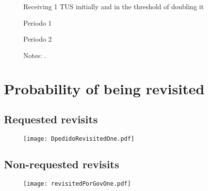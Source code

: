 \documentclass[12pt]{article}
\begin{document}
\begin{figure}[H]%
	\caption{Receiving 1 TUS initially and in the threshold of doubling it}%
	\centering
	\caption*{ {Periodo 1}}
	\qquad
	\caption*{Periodo 2}
	\label{fig:pp2013_seg_2TUS}%
	\caption*{ {\footnotesize Notes: .}}
\end{figure}

\section{Probability of being revisited}

\subsection{Requested revisits}
\begin{figure}[H]
	\centering
	\texttt{[image: DpedidoRevisitedOne.pdf]}
	\label{DpedidoRevisitedOne}
\end{figure}

\begin{landscape}
\begin{figure}[H]
	\centering
	
	\label{DpedidoRevisited1Tex}
\end{figure}
\end{landscape}

\begin{landscape}
	\begin{figure}[H]
		\centering
		
		\label{DpedidoRevisited2Tex}
	\end{figure}
\end{landscape}

\subsection{Non-requested revisits}
\begin{figure}[H]
	\centering
	\texttt{[image: revisitedPorGovOne.pdf]}
	\label{revisitedPorGovOne}
\end{figure}

\begin{figure}[H]
	\centering
\end{figure}
\end{document}
